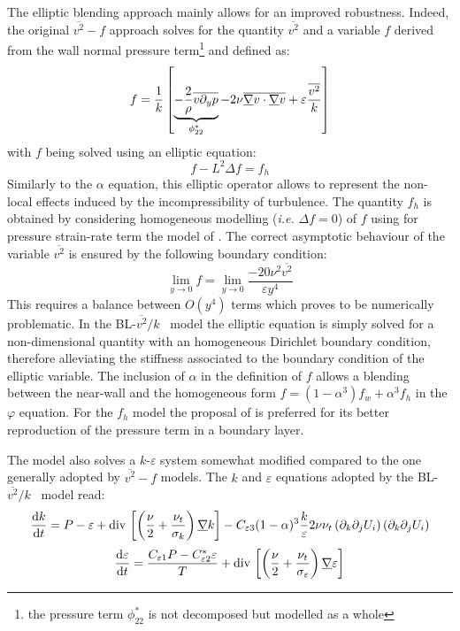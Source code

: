 The elliptic blending approach mainly allows for an improved robustness.
Indeed, the original $\overline{v^2}-f$ approach solves for the quantity
$\overline{v^2}$ and a variable $f$ derived from the wall normal
pressure term\footnote{the pressure term $\phi_{22}^*$ is not decomposed but modelled as a whole}
 and defined as:
%
\begin{equation}
	f= \dfrac{1}{k} \left[ \underbrace{-\dfrac{2}{\rho}\overline{v \partial_y p}}_{\phi_{22}^*}-2 \nu\overline{\underline{\nabla} v \cdot \underline{\nabla} v}+\varepsilon \dfrac{\overline{v^2}}{k} \right]
\end{equation}
%
with $f$ being solved using an elliptic equation:
%
\begin{equation}
	f-L^2 \Delta f = f_h
\end{equation}
%
Similarly to the $\alpha$ equation, this elliptic operator allows
 to represent the non-local effects induced by the
 incompressibility of turbulence. The quantity $f_h$ is obtained by
 considering homogeneous modelling (\emph{i.e.} $\Delta f=0$) of $f$ using
for pressure strain-rate term the model of \cite{Launder:1975}. The correct
 asymptotic behaviour of the variable $\overline{v^2}$ is ensured
 by the following boundary condition:
%
\begin{equation}
   \lim_{y\to 0} f = \lim_{y\to 0} \dfrac{-20 \nu^2 \overline{v^2}}{ \varepsilon y^4}
   \label{eq:turbul:blv2kbc_f_durbin}
\end{equation}
%
This requires a balance between $O(y^4)$ terms which proves to be numerically problematic.
 In the \mbox{BL-$\overline{v^2}/k$~} model the elliptic equation is simply solved
 for a non-dimensional quantity with an homogeneous Dirichlet boundary condition,
therefore alleviating the stiffness associated to the boundary condition of the
elliptic variable. The inclusion of $\alpha$ in the definition of $f$ allows a blending
between the near-wall and the homogeneous form $f=(1-\alpha^3) f_w+\alpha^3 f_h$ in the
$\varphi$ equation. For the $f_h$ model the proposal of \cite{Speziale:1991} is preferred
for its better reproduction of the pressure term in a boundary layer.

The model also solves a $k$-$\varepsilon$ system somewhat modified compared to the one
generally adopted by $\overline{v^2}-f$ models. The $k$ and $\varepsilon$ equations
adopted by the BL-$\overline{v^2}/k$~ model read:
%
\begin{equation} \label{eq:turbul:blv2kk}
   \dfrac{\mathrm{d}  k}{\mathrm{d} t} = P -  \varepsilon
           + \text{div}\, \left[ \left( \frac{\nu}{2}  + \frac{\nu_t}{\sigma_k}  \right) \underline{\nabla} k \right]
    - C_{\varepsilon 3} (1-\alpha)^3 \frac{k}{\varepsilon} 2 \nu  \nu_t \left( \partial_k \partial_j U_i \right)\left( \partial_k \partial_j  U_i \right)
 \end{equation}
\begin{equation}  \label{eq:turbul:blv2kep}
	\dfrac{\mathrm{d} \varepsilon}{\mathrm{d} t} = \frac{C_{\varepsilon 1} P - C_{\varepsilon 2}^* \varepsilon }{T}
          + \text{div}\, \left[ \left( \frac{\nu}{2}  + \frac{\nu_t}{\sigma_{\varepsilon}}  \right) \underline{\nabla} \varepsilon \right]
\end{equation}

